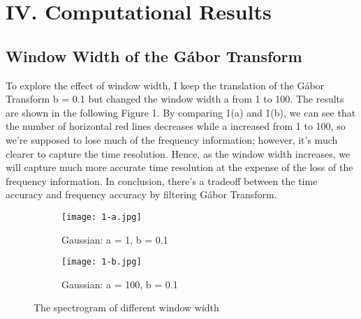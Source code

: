 \documentclass[12pt,letterpaper]{article}
\begin{document}
\section*{IV. Computational Results}
\subsection*{Window Width of the G\'abor Transform}
To explore the effect of window width, I keep the translation of the G\'abor Transform b = 0.1 but changed the window width a from 1 to 100. The results are shown in the following Figure 1. By comparing 1(a) and 1(b), we can see that the number of horizontal red lines decreases while a increased from 1 to 100, so we're supposed to lose much of the frequency information; however, it's much clearer to capture the time resolution. Hence, as the window width increases, we will capture much more accurate time resolution at the expense of the loss of the frequency information. In conclusion, there's a tradeoff between the time accuracy and frequency accuracy by filtering G\'abor Transform. 
\begin{figure}[ht]
\begin{subfigure}{.5\textwidth}
  \centering
  \texttt{[image: 1-a.jpg]}  
  \caption{Gaussian: a = 1, b = 0.1}
  \label{fig:sub-first}
\end{subfigure}
\begin{subfigure}{.5\textwidth}
  \centering
  \texttt{[image: 1-b.jpg]}  
  \caption{Gaussian: a = 100, b = 0.1}
  \label{fig:sub-second}
\end{subfigure}
\label{fig:fig}
\caption{The spectrogram of different window width}
\end{figure}
\end{document}
